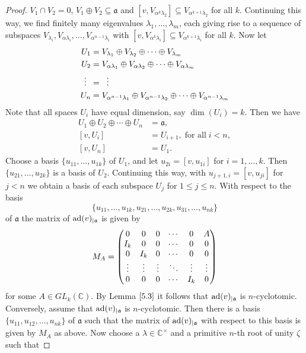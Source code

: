 \documentclass[12pt]{amsart}
\theoremstyle{definition}
\theoremstyle{remark}
\newcommand{\C}{\mathbb{C}}
\newcommand{\ad}{{\rm ad}}
\newcommand{\La}{\mathfrak{a}}
\newcommand{\al}{\alpha}
\newcommand{\la}{\lambda}
\begin{document}
\begin{proof}
$V_1\cap V_2=0$, $V_1\oplus V_2\subseteq \La$ and $[v,V_{\al^k\la_2}]\subseteq V_{\al^{k+1}\la_2}$ for all $k$.
Continuing this way, we find finitely many eigenvalues $\la_1,\ldots , \la_m$, each giving rise to a sequence of
subspaces $V_{\la_i}, V_{\al\la_i},\ldots ,V_{\al^{n-1}\la_i}$ with $[v,V_{\al^k\la_i}]\subseteq V_{\al^{k+1}\la_i}$ for all $k$.
Now let
\begin{align*}
U_1 & = V_{\la_1}\oplus V_{\la_2}\oplus \cdots \oplus V_{\la_m} \\
U_2 & = V_{\al\la_1}\oplus V_{\al\la_2}\oplus \cdots \oplus V_{\al\la_m} \\
\vdots \hspace*{0.18cm} & = \hspace*{0.2cm} \vdots \\
U_n & = V_{\al^{n-1}\la_1}\oplus V_{\al^{n-1}\la_2}\oplus \cdots \oplus V_{\al^{n-1}\la_m} \\
\end{align*}
Note that all spaces $U_i$ have equal dimension, say $\dim (U_i)=k$. Then we have
\begin{align*}
U_1\oplus U_2\oplus \cdots \oplus U_n & = \La, \\
[v,U_i] & = U_{i+1},\; \text{for all} \; i<n,\\
[v,U_n] & = U_1.
\end{align*}  
Choose a basis $\{u_{11},\ldots ,u_{1k}\}$ of $U_1$, and let $u_{2i}=[v,u_{1i}]$ for $i=1,\ldots ,k$.
Then $\{u_{21},\ldots ,u_{2k}\}$ is a basis of $U_2$. Continuing this way, with $u_{j+1,i}=[v,u_{ji}]$ for $j<n$
we obtain a basis of each subspace $U_j$ for $1 \le j\le n$. With respect to the basis
\[
\{u_{11},\ldots ,u_{1k},u_{21},\ldots ,u_{2k}, u_{31},\ldots ,u_{nk}\}
\]  
of $\La$ the matrix of $\ad(v)_{\mid \La}$ is given by
\[
M_A=  
\begin{pmatrix}
0 & 0 & 0 & \cdots & 0 & A \cr
I_k & 0 & 0 & \cdots & 0 & 0 \cr
0 & I_k & 0 & \cdots & 0 & 0 \cr
\vdots & \vdots & \vdots & \ddots & \vdots & \vdots \cr
0 & 0 & 0 & \cdots & I_k & 0 
\end{pmatrix}  
\]
for some $A\in GL_k(\C)$. By Lemma $\ref{5.3}$ it follows that $\ad(v)_{\mid \La}$ is $n$-cyclotomic. \\[0.2cm]
Conversely, assume that  $\ad(v)_{\mid \La}$ is $n$-cyclotomic. Then there is a basis $\{u_{11},u_{12}, \ldots ,u_{nk}\}$
of $\La$ such that the matrix of $\ad(v)_{\mid \La}$ with respect to this basis is given by $M_A$ as above. Now
choose a $\la\in \C^{\times}$ and a primitive $n$-th root of unity $\zeta$ such that

\end{proof}
\end{document}
